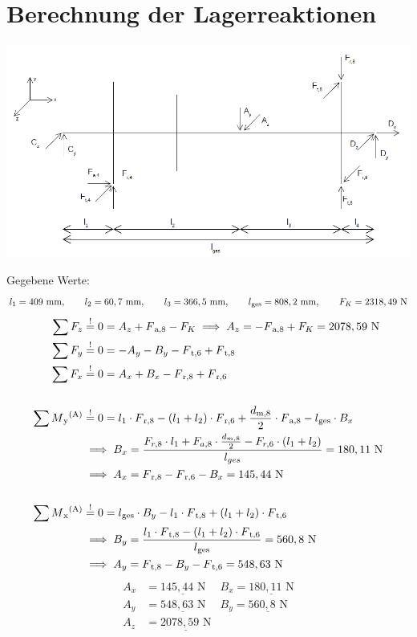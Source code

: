 \section{Berechnung der Lagerreaktionen}
\begin{center}
	\includegraphics{figures/Uebersicht}
\end{center}
Gegebene Werte:
\[l_1 = 409\text{ mm} , \qquad l_2 = 60,7\text{ mm}, \qquad l_3 =366,5\text{ mm}, \qquad l\textsubscript{ges}= 808,2\text{ mm} , \qquad F_K=2318,49 \text{ N} \]
\begin{align*}
    \sum F_z &\overset{!}{=} 0 = A_z + F\textsubscript{a,8} - F_K \implies A_z = - F\textsubscript{a,8} + F_K = 2078,59 \text{ N}\\ 
    \sum F_y &\overset{!}{=} 0 = -A_y- B_y - F\textsubscript{t,6} + F\textsubscript{t,8}\\ 
    \sum F_x &\overset{!}{=} 0 = A_x + B_x - F\textsubscript{r,8} + F\textsubscript{r,6}\\ \\
    \sum M\textsubscript{y}\textsuperscript{(A)} &\overset{!}{=} 0 =  l_1 \cdot F\textsubscript{r,8} - (l_1+l_2) \cdot F\textsubscript{r,6}+ \frac{d\textsubscript{m,8} }{2}\cdot F\textsubscript{a,8}- l\textsubscript{ges} \cdot B_x\\ 
    &\implies B_x = \frac{F_{r,8} \cdot l_1 + F_{a,8}\cdot \frac{d_{m,8}}{2}-F_{r,6}\cdot (l_1 + l_2)}{l_{ges}} = 180,11 \text { N} \\ 
    & \implies A_x = F\textsubscript{r,8} - F\textsubscript{r,6} - B_x = 145,44 \text{ N}\\ \\
    \sum M\textsubscript{x}\textsuperscript{(A)} &\overset{!}{=} 0 = l\textsubscript{ges} \cdot B_y - l_1 \cdot F\textsubscript{t,8} + (l_1+l_2) \cdot F\textsubscript{t,6} \\ 
    &\implies B_y = \frac{l_1\cdot F\textsubscript{t,8} - (l_1+l_2) \cdot F\textsubscript{t,6}}{l\textsubscript{ges}} = 560,8 \text{ N}\\ 
    & \implies A_y =   F\textsubscript{t,8}-B_y- F\textsubscript{t,6} =  548,63\text{ N}\\ 
\end{align*}
\begin{align*}
    A_x &= \underline{145,44\text{ N}} & B_x= \underline{180,11\text{ N}}\\
    A_y &= \underline{548,63\text{ N}} & B_y= \underline{560,8\text{ N}}\\
    A_z &= \underline{2078,59\text{ N}}
\end{align*}
